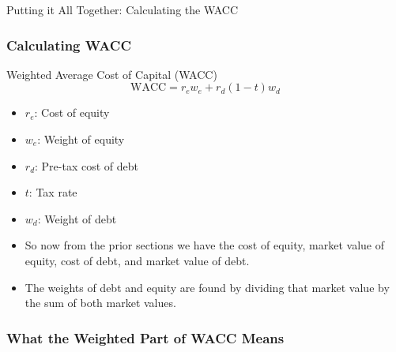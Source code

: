\documentclass[handout, 11pt]{beamer}
\begin{document}
\begin{section}[WACC]{Putting it All Together: Calculating the WACC}
\begin{frame}
\frametitle{Calculating WACC}
\begin{block}{Weighted Average Cost of Capital (WACC)}
\begin{equation}
	\text{WACC} = r_e w_e + r_d (1 - t) w_d
\end{equation}
\vspace{-0.4cm}
\begin{itemize}
\item $r_e$: Cost of equity
\item $w_e$: Weight of equity
\item $r_d$: Pre-tax cost of debt
\item $t$: Tax rate
\item $w_d$: Weight of debt
\end{itemize}
\end{block}
\begin{itemize}
\item So now from the prior sections we have the cost of equity, market value of equity, cost of debt, and market value of debt.
\vfill
\item The weights of debt and equity are found by dividing that market value by the sum of both market values.
\end{itemize}
\end{frame}
\begin{frame}
\frametitle{What the Weighted Part of WACC Means}
\begin{center}
\begin{adjustbox}{width=0.9\textwidth, height=0.35\textheight, keepaspectratio}
\end{adjustbox}
\end{center}
\end{frame}
\end{section}
\end{document}
